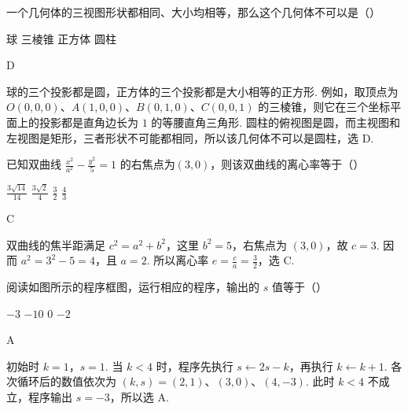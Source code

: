 \begin{problem}
一个几何体的三视图形状都相同、大小均相等，那么这个几何体不可以是（\quad）

\choices
    {球}
    {三棱锥}
    {正方体}
    {圆柱}
\end{problem}

\begin{answer}
D
\end{answer}

\begin{solution}
球的三个投影都是圆，正方体的三个投影都是大小相等的正方形. 例如，取顶点为 \(O(0,0,0)\)、\(A(1,0,0)\)、\(B(0,1,0)\)、\(C(0,0,1)\) 的三棱锥，则它在三个坐标平面上的投影都是直角边长为 \(1\) 的等腰直角三角形. 圆柱的俯视图是圆，而主视图和左视图是矩形，三者形状不可能都相同，所以该几何体不可以是圆柱，选 D.
\end{solution}

\begin{problem}
已知双曲线 \(\frac{x^2}{a^2} - \frac{y^2}{5} = 1\) 的右焦点为\((3,0)\)，则该双曲线的离心率等于（\quad）

\choices
    {\(\frac{3\sqrt{14}}{14}\)}
    {\(\frac{3\sqrt{2}}{4}\)}
    {\(\frac{3}{2}\)}
    {\(\frac{4}{3}\)}
\end{problem}

\begin{answer}
C
\end{answer}

\begin{solution}
双曲线的焦半距满足 \(c^2=a^2+b^2\)，这里 \(b^2=5\)，右焦点为 \((3,0)\)，故 \(c=3\). 因而 \(a^2=3^2-5=4\)，且 \(a=2\). 所以离心率 \(e=\frac{c}{a}=\frac{3}{2}\)，选 C.
\end{solution}

\begin{problem}
阅读如图所示的程序框图，运行相应的程序，输出的 \(s\) 值等于（\quad）


\choices
    {\(-3\)}
    {\(-10\)}
    {\(0\)}
    {\(-2\)}
\end{problem}

\begin{answer}
A
\end{answer}

\begin{solution}
初始时 \(k=1\)，\(s=1\). 当 \(k<4\) 时，程序先执行 \(s\leftarrow2s-k\)，再执行 \(k\leftarrow k+1\). 各次循环后的数值依次为
\( (k,s)=(2,1)\)、\((3,0)\)、\((4,-3)\). 此时 \(k<4\) 不成立，程序输出 \(s=-3\)，所以选 A.
\end{solution}

